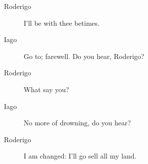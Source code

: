 \documentclass[11pt,twoside]{article}\makeatletter
\begin{document}
 \begin{description} \item[Roderigo] 

I'll be with thee betimes.\end{description}
 \begin{description} \item[Iago] 

Go to; farewell. Do you hear, Roderigo?\end{description}
 \begin{description} \item[Roderigo] 

What say you?\end{description}
 \begin{description} \item[Iago] 

No more of drowning, do you hear?\end{description}
 \begin{description} \item[Roderigo] 

I am changed: I'll go sell all my land.\end{description}
\end{document}
